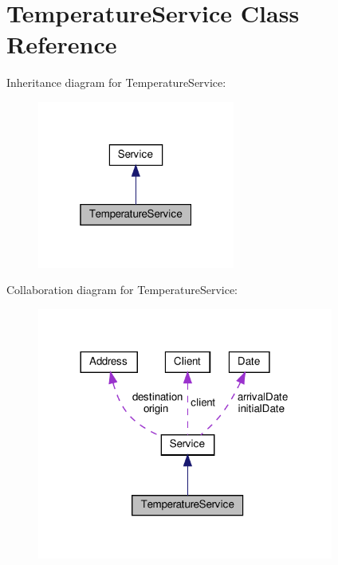 \hypertarget{class_temperature_service}{}\section{Temperature\+Service Class Reference}
\label{class_temperature_service}


Inheritance diagram for Temperature\+Service\+:\nopagebreak
\begin{figure}[H]
\begin{center}
\leavevmode
\includegraphics[width=184pt]{class_temperature_service__inherit__graph}
\end{center}
\end{figure}


Collaboration diagram for Temperature\+Service\+:\nopagebreak
\begin{figure}[H]
\begin{center}
\leavevmode
\includegraphics[width=276pt]{class_temperature_service__coll__graph}
\end{center}
\end{figure}
